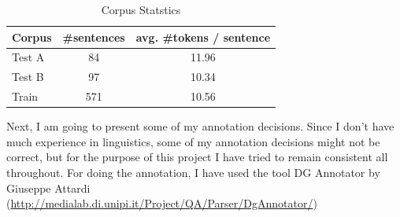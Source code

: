 \documentclass[11pt,letterpaper]{article}
\begin{document}
\begin{table}
\begin{center}
  \begin{tabular}{ l | c | c }
  \hline
  Corpus & \#sentences & avg. \#tokens / sentence\\
  \hline
  Test A & 84 & 11.96\\
  \hline
  Test B & 97 & 10.34\\
  \hline
  Train & 571 & 10.56\\
  \hline
     \end{tabular}
\end{center}
\caption{Corpus Statstics}
\label{Corpus_Stat}
\end{table}

Next, I am going to present some of my annotation decisions. Since I don't have much experience in linguistics, some of my annotation decisions might not be correct, but for the purpose of this project I have tried to remain consistent all throughout. For doing the annotation, I have used the tool DG Annotator by Giuseppe Attardi (\url{http://medialab.di.unipi.it/Project/QA/Parser/DgAnnotator/})\\
\end{document}
